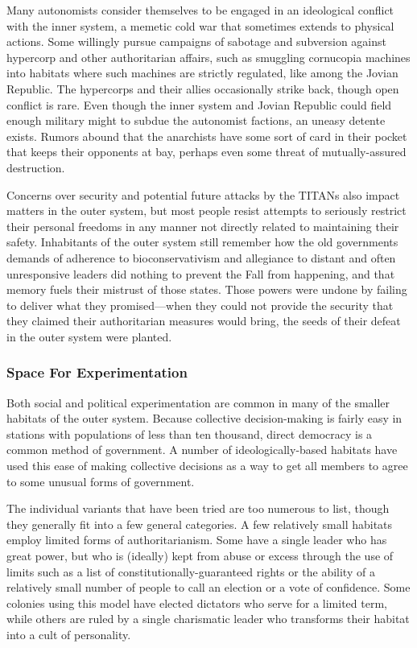 Many autonomists consider themselves to be 
engaged in an ideological conflict with the inner 
system, a memetic cold war that sometimes extends 
to physical actions. Some willingly pursue campaigns 
of sabotage and subversion against hypercorp and 
other authoritarian affairs, such as smuggling cornucopia
machines into habitats where such machines
are strictly regulated, like among the Jovian Republic. 
The hypercorps and their allies occasionally strike 
back, though open conflict is rare. Even though the 
inner system and Jovian Republic could field enough 
military might to subdue the autonomist factions, an 
uneasy detente exists. Rumors abound that the anarchists
have some sort of card in their pocket that
keeps their opponents at bay, perhaps even some 
threat of mutually-assured destruction.

Concerns over security and potential future attacks
by the TITANs also impact matters in the outer
system, but most people resist attempts to seriously 
restrict their personal freedoms in any manner not directly
related to maintaining their safety. Inhabitants
of the outer system still remember how the old governments
demands of adherence to bioconservativism
and allegiance to distant and often unresponsive leaders
did nothing to prevent the Fall from happening,
and that memory fuels their mistrust of those states. 
Those powers were undone by failing to deliver what 
they promised—when they could not provide the security
that they claimed their authoritarian measures
would bring, the seeds of their defeat in the outer 
system were planted.

\subsubsection{Space For Experimentation}

Both social and political experimentation are common 
in many of the smaller habitats of the outer system. 
Because collective decision-making is fairly easy in 
stations with populations of less than ten thousand, 
direct democracy is a common method of government. 
A number of ideologically-based habitats have used 
this ease of making collective decisions as a way to 
get all members to agree to some unusual forms of 
government.

The individual variants that have been tried are 
too numerous to list, though they generally fit into 
a few general categories. A few relatively small habitats
employ limited forms of authoritarianism. Some
have a single leader who has great power, but who is 
(ideally) kept from abuse or excess through the use 
of limits such as a list of constitutionally-guaranteed 
rights or the ability of a relatively small number of 
people to call an election or a vote of confidence. 
Some colonies using this model have elected dictators 
who serve for a limited term, while others are ruled 
by a single charismatic leader who transforms their 
habitat into a cult of personality.


